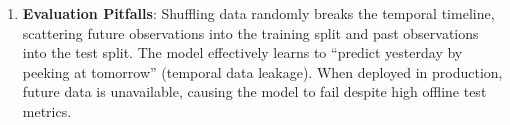 \begin{enumerate}
    \item \textbf{Evaluation Pitfalls}:
    Shuffling data randomly breaks the temporal timeline, scattering future observations into the training split and past observations into the test split. The model effectively learns to ``predict yesterday by peeking at tomorrow'' (temporal data leakage). When deployed in production, future data is unavailable, causing the model to fail despite high offline test metrics.
\end{enumerate}
